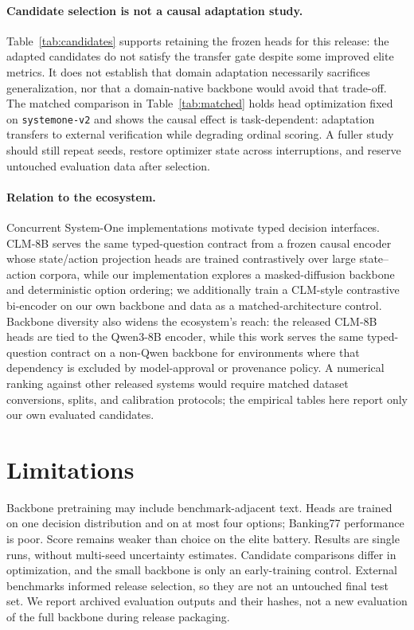 \documentclass[11pt]{article}
\begin{document}
\paragraph{Candidate selection is not a causal adaptation study.}
Table~\ref{tab:candidates} supports retaining the frozen heads for this
release: the adapted candidates do not satisfy the transfer gate despite
some improved elite metrics. It does not establish that domain adaptation
necessarily sacrifices generalization, nor that a domain-native backbone
would avoid that trade-off. The matched comparison in
Table~\ref{tab:matched} holds head optimization fixed on
\texttt{systemone-v2} and shows the causal effect is task-dependent:
adaptation transfers to external verification while degrading ordinal
scoring. A fuller study should still repeat seeds, restore optimizer
state across interruptions, and reserve untouched evaluation data after
selection.

\paragraph{Relation to the ecosystem.}
Concurrent System-One implementations motivate typed decision interfaces.
CLM-8B \cite{clm} serves the same typed-question contract from a frozen
causal encoder whose state/action projection heads are trained
contrastively over large state--action corpora, while our implementation
explores a masked-diffusion backbone and deterministic option ordering;
we additionally train a CLM-style contrastive bi-encoder on our own
backbone and data as a matched-architecture control. Backbone diversity
also widens the ecosystem's reach: the released CLM-8B heads are tied to
the Qwen3-8B encoder, while this work serves the same typed-question
contract on a non-Qwen backbone for environments where that dependency
is excluded by model-approval or provenance policy. A numerical ranking
against other released systems would require matched dataset
conversions,
splits, and calibration protocols; the empirical tables here report only
our own evaluated candidates.

\section{Limitations}
Backbone pretraining may include benchmark-adjacent text. Heads are trained
on one decision distribution and on at most four options; Banking77
performance is poor. Score remains weaker than choice on the elite
battery. Results are single runs, without multi-seed uncertainty
estimates. Candidate comparisons differ in optimization, and the small
backbone is only an early-training control. External benchmarks informed
release selection, so they are not an untouched final test set. We report
archived evaluation outputs and their hashes, not a new evaluation of the
full backbone during release packaging.
\end{document}
